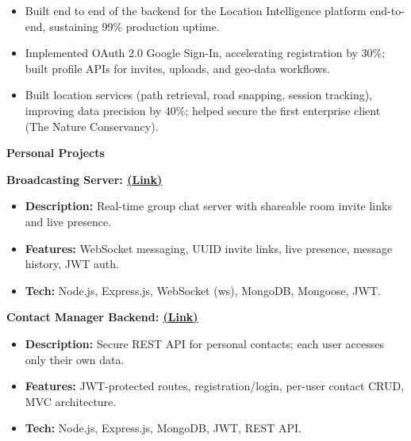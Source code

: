 \documentclass[a4paper,10pt]{article}
\newcommand{\cvsection}[1]{%
  \vspace{4.5mm} %
  \begin{tcolorbox}
    \textbf{\large #1}
  \end{tcolorbox}
  \vspace{-6mm}
}
\begin{document}
\begin{itemize}[leftmargin=0pt, label={}]
  \vspace{1pt}
  \begin{itemize}[leftmargin=*]
      \item Built end to end of the backend for the Location Intelligence platform end-to-end, sustaining 99\% production uptime.
      \item Implemented OAuth 2.0 Google Sign-In, accelerating registration by 30\%; built profile APIs for invites, uploads, and geo-data workflows.
      \item Built location services (path retrieval, road snapping, session tracking), improving data precision by 40\%; helped secure the first enterprise client (The Nature Conservancy).
  \end{itemize}
\end{itemize}
\vspace{-9pt}


\cvsection{Personal Projects}
\vspace{12pt}
\begin{itemize}[leftmargin=*, label={}]
  \begin{minipage}[t]{0.48\textwidth}
    \item \textbf{Broadcasting Server: \href{https://broadcasting-server.onrender.com/}{(Link)}}
    \vspace{3pt}
    \begin{itemize}[itemsep=3pt]
      \item \textbf{Description:} Real-time group chat server with shareable room invite links and live presence.
      \item \textbf{Features:} WebSocket messaging, UUID invite links, live presence, message history, JWT auth.
      \item \textbf{Tech:} Node.js, Express.js, WebSocket (ws), MongoDB, Mongoose, JWT.
    \end{itemize}
  \end{minipage}\hfill
  \begin{minipage}[t]{0.48\textwidth}
    \item \textbf{Contact Manager Backend: \href{https://contact-manager-backend-z9l4.onrender.com/api-docs/}{(Link)}}
    \vspace{3pt}
    \begin{itemize}[itemsep=3pt]
      \item \textbf{Description:} Secure REST API for personal contacts; each user accesses only their own data.
      \item \textbf{Features:} JWT-protected routes, registration/login, per-user contact CRUD, MVC architecture.
      \item \textbf{Tech:} Node.js, Express.js, MongoDB, JWT, REST API.
    \end{itemize}
  \end{minipage}
\end{itemize}
\vspace{-13pt}
\end{document}
